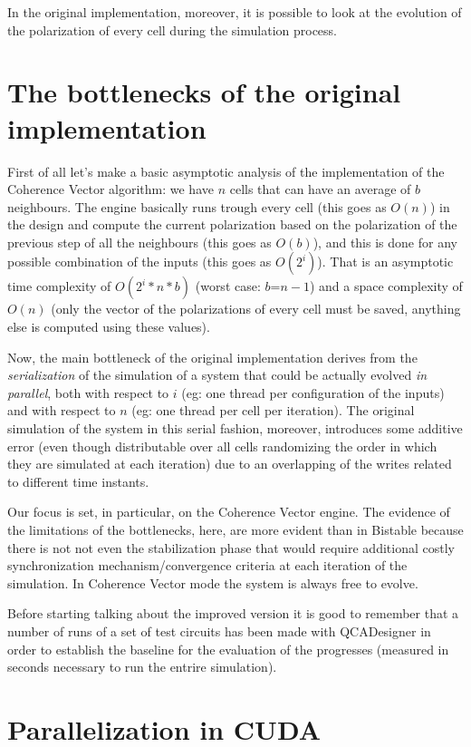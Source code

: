 In the original implementation, moreover, it is possible to look at the evolution of the polarization of every cell during the simulation process.
\section {The bottlenecks of the original implementation}
First of all let's make a basic asymptotic analysis of the implementation of the Coherence Vector algorithm: we have $n$ cells that can have an average of $b$ neighbours. The engine basically runs trough every cell (this goes as $O(n)$) in the design and compute the current polarization based on the polarization of the previous step of all the neighbours (this goes as $O(b)$), and this is done for any possible combination of the inputs (this goes as $O(2^i)$). That is an asymptotic time complexity of $O(2^i*n*b)$  (worst case: $b$=$n-1$) and a space complexity of $O(n)$ (only the vector of the polarizations of every cell must be saved, anything else is computed using these values).

Now, the main bottleneck of the original implementation derives from the \textsl{serialization} of the simulation of a system that could be actually evolved \textsl{in parallel}, both with respect to $i$ (eg: one thread per configuration of the inputs) and with respect to $n$ (eg: one thread per cell per iteration). The original simulation of the system in this serial fashion, moreover, introduces some additive error (even though distributable over all cells randomizing the order in which they are simulated at each iteration) due to an overlapping of the writes related to different time instants. 

Our focus is set, in particular, on the Coherence Vector engine. The evidence of the limitations of the bottlenecks, here, are more evident than in Bistable because there is not not even the stabilization phase that would require additional costly synchronization mechanism/convergence criteria at each iteration of the simulation. In Coherence Vector mode the system is always free to evolve.

Before starting talking about the improved version it is good to remember that a number of runs of a set of test circuits has been made with QCADesigner in order to establish the baseline for the evaluation of the progresses (measured in seconds necessary to run the entrire simulation).
\section {Parallelization in CUDA}
